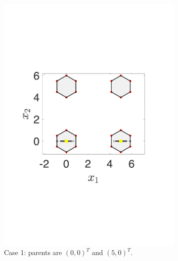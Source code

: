 \documentclass[conference]{IEEEtran}
\begin{document}
\begin{figure}[t!]
	\centering
	\begin{subfigure}[b]{.24\textwidth}
		\includegraphics[width=\linewidth]{Section3/crossover1}
		\caption{Case 1: parents are $(0, 0)^T$ and $(5, 0)^T$.}
		\label{fig: SBX crossover case 1}
	\end{subfigure}
	\begin{subfigure}[b]{.24\textwidth}

\end{subfigure}
\end{figure}
\end{document}
